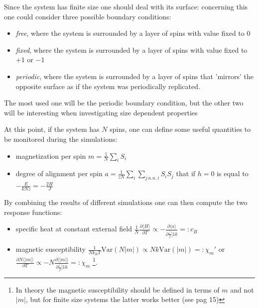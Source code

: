 \documentclass[a4paper, 11pt]{article}
\begin{document}
    Since the system has finite size one should deal with its surface: concerning this one could consider three possible boundary conditions:
    \begin{itemize}
      \item \emph{free}, where the system is surrounded by a layer of spins with value fixed to $0$
      \item \emph{fixed}, where the system is surrounded by a layer of spins with value fixed to $+1$ or $-1$
      \item \emph{periodic}, where the system is surrounded by a layer of spins that 'mirrors' the opposite surface as if the system was periodically replicated.
    \end{itemize}
    The most used one will be the periodic boundary condition, but the other two will be interesting when investigating size dependent properties

    At this point, if the system has $N$ spins, one can define some useful quantities to be monitored during the simulations:
    \begin{itemize}
      \item magnetization per spin $m = \frac{1}{N} \sum_i S_i$
      \item degree of alignment per spin $a = \frac{1}{zN} \sum_i \sum_{j \, n.n. \, i} S_i S_j$ that if $h = 0$ is equal to $-\frac{E}{kNz} = -\frac{2H}{J}$
    \end{itemize}

    By combining the results of different simulations one can then compute the two response functions:
    \begin{itemize}
      \item specific heat at constant external field $\frac{1}{N} \frac{\partial \langle H \rangle }{\partial T} \propto -\frac{\partial \langle a \rangle }{\partial \frac[f]{1}{k}} =: c_B$
      \item magnetic susceptibility $\frac{1}{Nk_BT} \text{Var}(N|m|) \propto Nk\text{Var}(|m|) =: \chi_m'$ or $\frac{\partial N \langle |m| \rangle }{\partial T} \propto -N\frac{\partial \langle |m| \rangle }{\partial \frac[f]{1}{k}} =: \chi_m$ \footnote{In theory the magnetic susceptibility should be defined in terms of $m$ and not $|m|$, but for finite size systems the latter works better (see \cite{rif:eye-opener} pag 15)}.
    \end{itemize}
\end{document}
